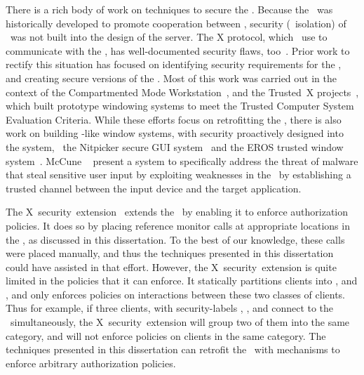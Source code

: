 There is a rich body of work on techniques to secure the \xserver.  Because the
\xserver\ was historically developed to promote cooperation between \xclients,
security (\eg~isolation) of \xclients\ was not built into the design of the
server. The X protocol, which \xclients\ use to communicate with the \xserver,
has well-documented security flaws, too~\cite{w96b}. Prior work to rectify this
situation has focused on identifying security requirements for the \xserver,
and creating secure versions of the \xserver. Most of this work was carried out
in the context of the Compartmented Mode Workstation~\cite{bpw+90,ep91,p91},
and the Trusted~X projects~\cite{emo+93,e90}, which built prototype windowing
systems to meet the Trusted Computer System Evaluation Criteria. While these
efforts focus on retrofitting the \xserver, there is also work on building
\xserver-like window systems, with security proactively designed into the
system, \eg~the Nitpicker secure GUI system~\cite{fh05} and the EROS trusted
window system~\cite{svn+04}. McCune \etal~\cite{mpr06} present a system to
specifically address the threat of malware that steal sensitive user input by
exploiting weaknesses in the \xserver\ by establishing a trusted channel
between the input device and the target application.

The X~security~extension~\cite{w96a} extends the \xserver\ by enabling it to
enforce authorization policies. It does so by placing reference monitor calls
at appropriate locations in the \xserver, as discussed in this dissertation. To
the best of our knowledge, these calls were placed manually, and thus the
techniques presented in this dissertation could have assisted in that effort.
However, the X~security~extension is quite limited in the policies that it can
enforce.  It statically partitions clients into , and
, and only enforces policies on interactions between these
two classes of clients.  Thus for example, if three clients, with
security-labels , , and
 connect to the \xserver\ simultaneously, the
X~security~extension will group two of them into the same category, and will
not enforce policies on clients in the same category.  The techniques presented
in this dissertation can retrofit the \xserver\ with mechanisms to enforce
arbitrary authorization policies.


